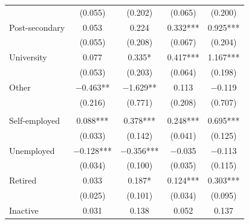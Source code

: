 \begin{table}
\begin{tabular}[t]{lcccc}
\hspace{1em} & (\num{0.055}) & (\num{0.202}) & (\num{0.065}) & (\num{0.200})\\
\hspace{1em}\hspace{6pt} Post-secondary & \num{0.053} & \num{0.224} & \num{0.332}*** & \num{0.925}***\\
\hspace{1em} & (\num{0.055}) & (\num{0.208}) & (\num{0.067}) & (\num{0.204})\\
\hspace{1em}\hspace{6pt} University & \num{0.077} & \num{0.335}* & \num{0.417}*** & \num{1.167}***\\
\hspace{1em} & (\num{0.053}) & (\num{0.203}) & (\num{0.064}) & (\num{0.198})\\
\hspace{1em}\hspace{6pt} Other & \num{-0.463}** & \num{-1.629}** & \num{0.113} & \num{-0.119}\\
\hspace{1em} & (\num{0.216}) & (\num{0.771}) & (\num{0.208}) & (\num{0.707})\\
\addlinespace[0.3em]
\multicolumn{5}{l}{\textit{Labour status (ref.: Employed)}}\\
\hspace{1em}\hspace{6pt} Self-employed & \num{0.088}*** & \num{0.378}*** & \num{0.248}*** & \num{0.695}***\\
\hspace{1em} & (\num{0.033}) & (\num{0.142}) & (\num{0.041}) & (\num{0.125})\\
\hspace{1em}\hspace{6pt} Unemployed & \num{-0.128}*** & \num{-0.356}*** & \num{-0.035} & \num{-0.113}\\
\hspace{1em} & (\num{0.034}) & (\num{0.100}) & (\num{0.035}) & (\num{0.115})\\
\hspace{1em}\hspace{6pt} Retired & \num{0.033} & \num{0.187}* & \num{0.124}*** & \num{0.303}***\\
\hspace{1em} & (\num{0.025}) & (\num{0.101}) & (\num{0.034}) & (\num{0.095})\\
\hspace{1em}\hspace{6pt} Inactive & \num{0.031} & \num{0.138} & \num{0.052} & \num{0.137}\\

\end{tabular}
\end{table}
